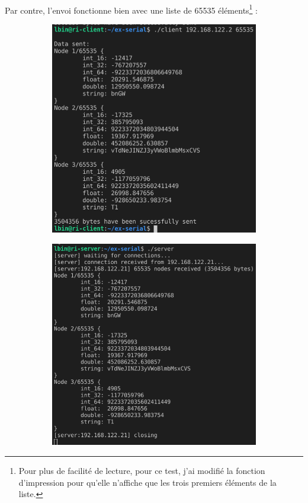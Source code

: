 \documentclass{article}
\begin{document}
    \paragraph{}
    Par contre, l'envoi fonctionne bien avec une liste de 65535 éléments\footnote{Pour plus de facilité de lecture, pour ce test, j'ai modifié la fonction d'impression pour qu'elle n'affiche que les trois premiers éléments de la liste.} :
    \begin{figure}[H]
        \centering
        \begin{subfigure}[b]{.48\textwidth}
            \centering
            \includegraphics[width=.96\textwidth]{./screenshots/client-test-65535.png}
        \end{subfigure}
        \begin{subfigure}[b]{.48\textwidth}
            \centering
            \includegraphics[width=\textwidth]{./screenshots/server-test-65535.png}

\end{subfigure}
\end{figure}
\end{document}
